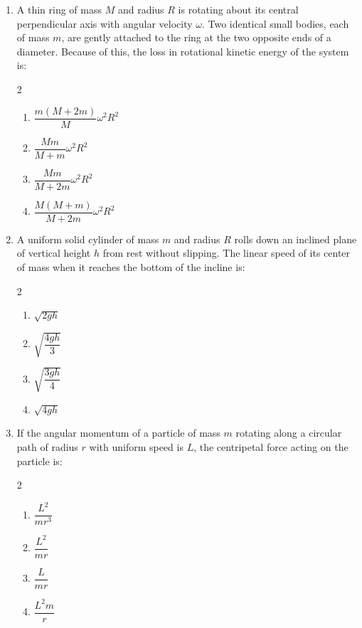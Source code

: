 \documentclass[11pt,a4paper]{article}
\begin{document}
\begin{enumerate}[label=\textbf{Q\arabic*.},leftmargin=24pt,itemsep=12pt]
  \item A thin ring of mass $M$ and radius $R$ is rotating about its central perpendicular axis with angular velocity $\omega$. Two identical small bodies, each of mass $m$, are gently attached to the ring at the two opposite ends of a diameter. Because of this, the loss in rotational kinetic energy of the system is:
  \begin{multicols}{2}
  \begin{enumerate}[label=(\Alph*),itemsep=2pt]
    \item $\dfrac{m(M+2m)}{M}\omega^2 R^2$
    \item $\dfrac{Mm}{M+m}\omega^2 R^2$
    \item $\dfrac{Mm}{M+2m}\omega^2 R^2$
    \item $\dfrac{M(M+m)}{M+2m}\omega^2 R^2$
  \end{enumerate}
  \end{multicols}

  \item A uniform solid cylinder of mass $m$ and radius $R$ rolls down an inclined plane of vertical height $h$ from rest without slipping. The linear speed of its center of mass when it reaches the bottom of the incline is:
  \begin{multicols}{2}
  \begin{enumerate}[label=(\Alph*),itemsep=2pt]
    \item $\sqrt{2gh}$
    \item $\sqrt{\dfrac{4gh}{3}}$
    \item $\sqrt{\dfrac{3gh}{4}}$
    \item $\sqrt{4gh}$
  \end{enumerate}
  \end{multicols}

  \item If the angular momentum of a particle of mass $m$ rotating along a circular path of radius $r$ with uniform speed is $L$, the centripetal force acting on the particle is:
  \begin{multicols}{2}
  \begin{enumerate}[label=(\Alph*),itemsep=2pt]
    \item $\dfrac{L^2}{m r^3}$
    \item $\dfrac{L^2}{m r}$
    \item $\dfrac{L}{m r}$
    \item $\dfrac{L^2 m}{r}$
  \end{enumerate}
  \end{multicols}


\end{enumerate}
\end{document}
